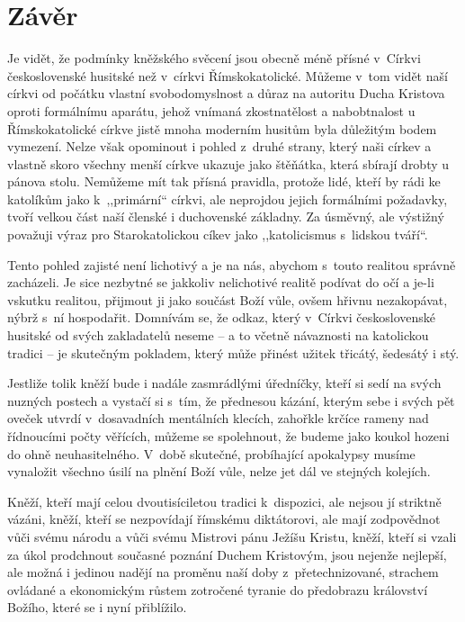 \chapter{Závěr}

Je vidět, že podmínky kněžského svěcení jsou obecně méně přísné v~Církvi
československé husitské než v~církvi Římskokatolické. Můžeme v~tom vidět naší
církvi od počátku vlastní svobodomyslnost a důraz na autoritu Ducha Kristova
oproti formálnímu aparátu, jehož vnímaná zkostnatělost a nabobtnalost u
Římskokatolické církve jistě mnoha moderním husitům byla důležitým bodem
vymezení. Nelze však opominout i pohled z~druhé strany, který naši církev a
vlastně skoro všechny menší církve ukazuje jako štěňátka, která sbírají drobty u
pánova stolu. Nemůžeme mít tak přísná pravidla, protože lidé, kteří by rádi ke
katolíkům jako k~,,primární`` církvi, ale neprojdou jejich formálními požadavky,
tvoří velkou část naší členské i duchovenské základny. Za úsměvný, ale výstižný
považuji výraz pro Starokatolickou cíkev jako ,,katolicismus s~lidskou tváří``.

Tento pohled zajisté není lichotivý a je na nás, abychom s~touto realitou
správně zacházeli. Je sice nezbytné se jakkoliv nelichotivé realitě podívat do
očí a je-li vskutku realitou, přijmout ji jako součást Boží vůle, ovšem hřivnu
nezakopávat, nýbrž s~ní hospodařit. Domnívám se, že odkaz, který v~Církvi
československé husitské od svých zakladatelů neseme -- a to včetně návaznosti na
katolickou tradici -- je skutečným pokladem, který může přinést užitek třicátý,
šedesátý i stý.

Jestliže tolik kněží bude i nadále zasmrádlými úředníčky, kteří si sedí na svých
nuzných postech a vystačí si s~tím, že přednesou kázání, kterým sebe i svých pět
oveček utvrdí v~dosavadních mentálních klecích, zahořkle krčíce rameny nad
řídnoucími počty věřících, můžeme se spolehnout, že budeme jako koukol hozeni do
ohně neuhasitelného. V~době skutečné, probíhající apokalypsy musíme vynaložit
všechno úsilí na plnění Boží vůle, nelze jet dál ve stejných kolejích.

Kněží, kteří mají celou dvoutisíciletou tradici k~dispozici, ale nejsou jí
striktně vázáni, kněží, kteří se nezpovídají římskému diktátorovi, ale mají
zodpovědnot vůči svému národu a vůči svému Mistrovi pánu Ježíšu Kristu, kněží,
kteří si vzali za úkol prodchnout současné poznání Duchem Kristovým, jsou
nejenže nejlepší, ale možná i jedinou nadějí na proměnu naší doby
z~přetechnizované, strachem ovládané a ekonomickým růstem zotročené tyranie do
předobrazu království Božího, které se i nyní přiblížilo.

